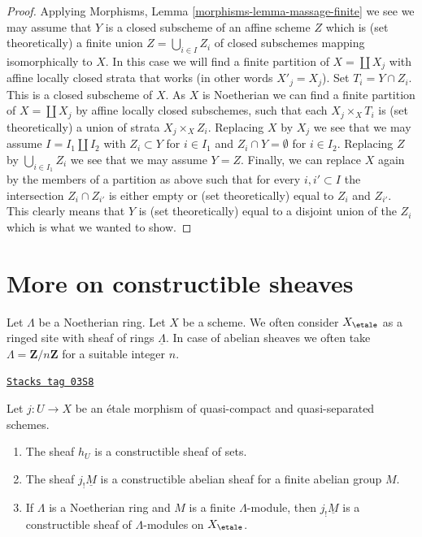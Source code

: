 \begin{proof}
\medskip\noindent
Applying Morphisms, Lemma \ref{morphisms-lemma-massage-finite}
we see we may assume that $Y$ is a closed subscheme of an
affine scheme $Z$ which is (set theoretically) a finite union
$Z = \bigcup_{i \in I} Z_i$ of closed subschemes mapping isomorphically
to $X$. In this case we will find a finite partition of $X = \coprod X_j$
with affine locally closed strata that works (in other words $X'_j = X_j$).
Set $T_i = Y \cap Z_i$. This is a closed subscheme of $X$.
As $X$ is Noetherian we can find a finite partition of $X = \coprod X_j$
by affine locally closed subschemes, such that each
$X_j \times_X T_i$ is (set theoretically) a union of strata $X_j \times_X Z_i$.
Replacing $X$ by $X_j$ we see that we may assume $I = I_1 \amalg I_2$
with $Z_i \subset Y$ for $i \in I_1$ and $Z_i \cap Y = \emptyset$ for
$i \in I_2$. Replacing $Z$ by $\bigcup_{i \in I_1} Z_i$ we see that we
may assume $Y = Z$.
Finally, we can replace $X$ again by the members of a partition
as above such that for every $i, i' \subset I$ the intersection
$Z_i \cap Z_{i'}$ is either empty or (set theoretically) equal
to $Z_i$ and $Z_{i'}$. This clearly means that $Y$ is (set theoretically)
equal to a disjoint union of the $Z_i$ which is what we wanted to show.
\end{proof}

\section{More on constructible sheaves}
\label{etale-cohomology-section-more-constructible}
Let $\Lambda$ be a Noetherian ring. Let $X$ be a scheme.
We often consider $X_\etale$ as a ringed site with
sheaf of rings $\underline{\Lambda}$. In case of abelian sheaves
we often take $\Lambda = \mathbf{Z}/n\mathbf{Z}$ for a suitable
integer $n$.

\begin{lemma}
\label{etale-cohomology-lemma-jshriek-constructible}
\href{https://stacks.math.columbia.edu/tag/03S8}{\texttt{Stacks tag 03S8}}

Let $j : U \to X$ be an \'etale morphism of quasi-compact and
quasi-separated schemes.
\begin{enumerate}
\item The sheaf $h_U$ is a constructible sheaf of sets.
\item The sheaf $j_!\underline{M}$ is a constructible abelian sheaf
for a finite abelian group $M$.
\item If $\Lambda$ is a Noetherian ring and $M$ is a finite $\Lambda$-module,
then $j_!\underline{M}$ is a constructible sheaf of $\Lambda$-modules
on $X_\etale$.
\end{enumerate}
\end{lemma}

